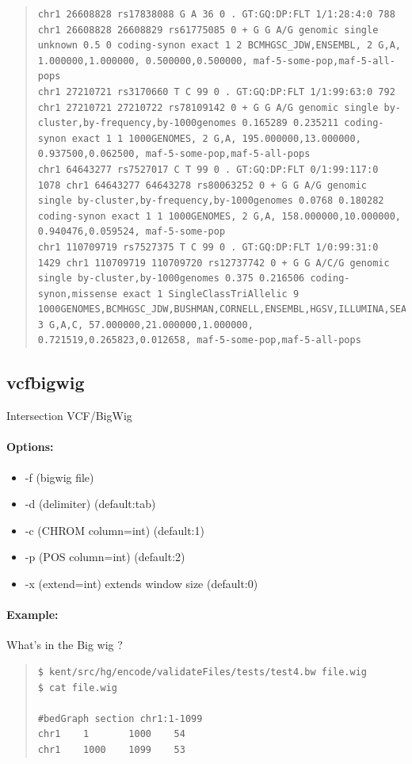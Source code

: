 \documentclass[12pt]{article}
\begin{document}
\begin{quote}
\begin{verbatim}
chr1 26608828 rs17838088 G A 36 0 . GT:GQ:DP:FLT 1/1:28:4:0 788 chr1 26608828 26608829 rs61775085 0 + G G A/G genomic single unknown 0.5 0 coding-synon exact 1 2 BCMHGSC_JDW,ENSEMBL, 2 G,A, 1.000000,1.000000, 0.500000,0.500000, maf-5-some-pop,maf-5-all-pops
chr1 27210721 rs3170660 T C 99 0 . GT:GQ:DP:FLT 1/1:99:63:0 792 chr1 27210721 27210722 rs78109142 0 + G G A/G genomic single by-cluster,by-frequency,by-1000genomes 0.165289 0.235211 coding-synon exact 1 1 1000GENOMES, 2 G,A, 195.000000,13.000000, 0.937500,0.062500, maf-5-some-pop,maf-5-all-pops
chr1 64643277 rs7527017 C T 99 0 . GT:GQ:DP:FLT 0/1:99:117:0 1078 chr1 64643277 64643278 rs80063252 0 + G G A/G genomic single by-cluster,by-frequency,by-1000genomes 0.0768 0.180282 coding-synon exact 1 1 1000GENOMES, 2 G,A, 158.000000,10.000000, 0.940476,0.059524, maf-5-some-pop
chr1 110709719 rs7527375 T C 99 0 . GT:GQ:DP:FLT 1/0:99:31:0 1429 chr1 110709719 110709720 rs12737742 0 + G G A/C/G genomic single by-cluster,by-1000genomes 0.375 0.216506 coding-synon,missense exact 1 SingleClassTriAllelic 9 1000GENOMES,BCMHGSC_JDW,BUSHMAN,CORNELL,ENSEMBL,HGSV,ILLUMINA,SEATTLESEQ,SSAHASNP, 3 G,A,C, 57.000000,21.000000,1.000000, 0.721519,0.265823,0.012658, maf-5-some-pop,maf-5-all-pops
\end{verbatim}
\end{quote}

\subsection{vcfbigwig}
Intersection VCF/BigWig
\paragraph{Options:}
\begin{itemize}
\item-f (bigwig file)
\item-d (delimiter) (default:tab)
\item-c (CHROM column=int) (default:1)
\item-p (POS column=int) (default:2)
\item-x (extend=int) extends window size (default:0)
\end{itemize}
\paragraph{Example:}
What's in the Big wig ?
\begin{quote}
\begin{verbatim}
$ kent/src/hg/encode/validateFiles/tests/test4.bw file.wig
$ cat file.wig

#bedGraph section chr1:1-1099
chr1    1       1000    54
chr1    1000    1099    53
\end{verbatim}
\end{quote}
\end{document}
